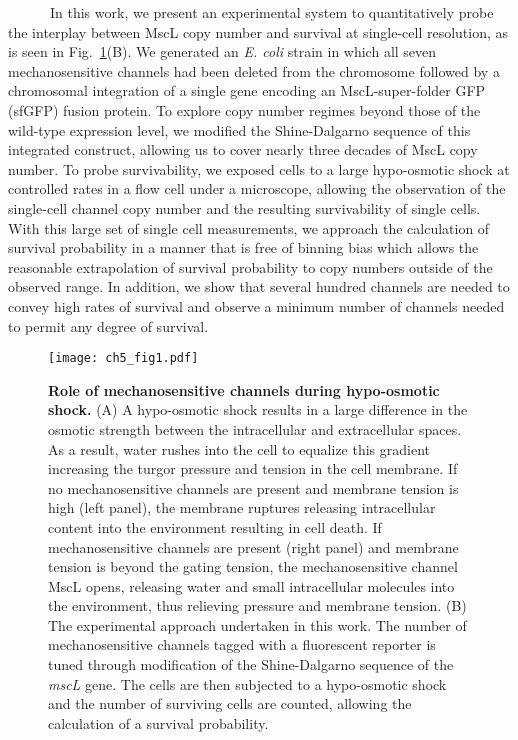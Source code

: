 \documentclass[12pt]{caltech_thesis}
\begin{document}
~ ~ ~ ~In this work, we present an experimental system to quantitatively
probe the interplay between MscL copy number and survival at single-cell
resolution, as is seen in Fig.~\ref{fig:overview}(B). We generated an
\emph{E. coli} strain in which all seven mechanosensitive channels had
been deleted from the chromosome followed by a chromosomal integration
of a single gene encoding an MscL-super-folder GFP (sfGFP) fusion
protein. To explore copy number regimes beyond those of the wild-type
expression level, we modified the Shine-Dalgarno sequence of this
integrated construct, allowing us to cover nearly three decades of MscL
copy number. To probe survivability, we exposed cells to a large
hypo-osmotic shock at controlled rates in a flow cell under a
microscope, allowing the observation of the single-cell channel copy
number and the resulting survivability of single cells. With this large
set of single cell measurements, we approach the calculation of survival
probability in a manner that is free of binning bias which allows the
reasonable extrapolation of survival probability to copy numbers outside
of the observed range. In addition, we show that several hundred
channels are needed to convey high rates of survival and observe a
minimum number of channels needed to permit any degree of survival.

\hypertarget{fig:overview}{%
\begin{figure}
\centering
\texttt{[image: ch5\_fig1.pdf]}
\caption[{Role of mechanosensitive channels during hypo-osmotic
shock.}]{\textbf{Role of mechanosensitive channels during hypo-osmotic
shock.} (A) A hypo-osmotic shock results in a large difference in the
osmotic strength between the intracellular and extracellular spaces. As
a result, water rushes into the cell to equalize this gradient
increasing the turgor pressure and tension in the cell membrane. If no
mechanosensitive channels are present and membrane tension is high (left
panel), the membrane ruptures releasing intracellular content into the
environment resulting in cell death. If mechanosensitive channels are
present (right panel) and membrane tension is beyond the gating tension,
the mechanosensitive channel MscL opens, releasing water and small
intracellular molecules into the environment, thus relieving pressure
and membrane tension. (B) The experimental approach undertaken in this
work. The number of mechanosensitive channels tagged with a fluorescent
reporter is tuned through modification of the Shine-Dalgarno sequence of
the \emph{mscL} gene. The cells are then subjected to a hypo-osmotic
shock and the number of surviving cells are counted, allowing the
calculation of a survival probability.}
\label{fig:overview}
\end{figure}
}
\end{document}
